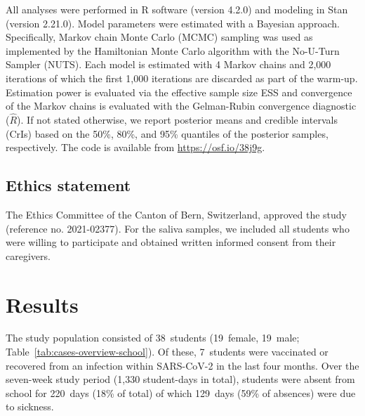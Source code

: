 \documentclass[fleqn,11pt]{wlscirep}
\begin{document}
\noindent All analyses were performed in R software (version 4.2.0)\cite{RCoreTeam2022} and modeling in Stan (version 2.21.0)\cite{Carpenter2017}. Model parameters were estimated with a Bayesian approach. Specifically, Markov chain Monte Carlo (MCMC) sampling was used as implemented by the Hamiltonian Monte Carlo algorithm with the No-U-Turn Sampler (NUTS)\cite{Hoffman2014}. Each model is estimated with 4 Markov chains and 2,000 iterations of which the first 1,000 iterations are discarded as part of the warm-up. Estimation power is evaluated via the effective sample size ESS and convergence of the Markov chains is evaluated with the Gelman-Rubin convergence diagnostic ($\hat{R}$). If not stated otherwise, we report posterior means and credible intervals (CrIs) based on the 50\%, 80\%, and 95\% quantiles of the posterior samples, respectively. The code is available from \url{https://osf.io/38j9g}.



\subsection{Ethics statement}

\noindent The Ethics Committee of the Canton of Bern, Switzerland, approved the study (reference no. 2021-02377). For the saliva samples, we included all students who were willing to participate and obtained written informed consent from their caregivers.


\newpage

\section{Results}

The study population consisted of 38~students (19~female, 19~male; Table~\ref{tab:cases-overview-school}). Of these, 7~students were vaccinated or recovered from an infection within SARS-CoV-2 in the last four months. Over the seven-week study period (1,330 student-days in total), students were absent from school for 220~days (18\% of total) of which 129~days (59\% of absences) were due to sickness.  
\end{document}

